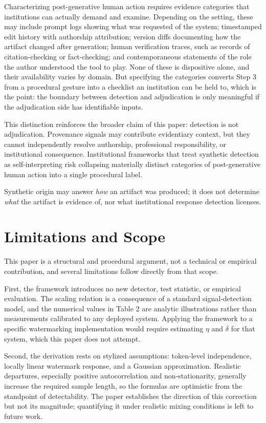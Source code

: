 \documentclass[11pt]{article}
\begin{document}
Characterizing post-generative human action requires evidence categories that
institutions can actually demand and examine. Depending on the setting, these may
include prompt logs showing what was requested of the system; timestamped edit
history with authorship attribution; version diffs documenting how the artifact
changed after generation; human verification traces, such as records of
citation-checking or fact-checking; and contemporaneous statements of the role the
author understood the tool to play. None of these is dispositive alone, and their
availability varies by domain. But specifying the categories converts Step 3 from a
procedural gesture into a checklist an institution can be held to, which is the
point: the boundary between detection and adjudication is only meaningful if the
adjudication side has identifiable inputs.

This distinction reinforces the broader claim of this paper: detection is not
adjudication. Provenance signals may contribute evidentiary context, but they cannot
independently resolve authorship, professional responsibility, or institutional
consequence. Institutional frameworks that treat synthetic detection as
self-interpreting risk collapsing materially distinct categories of post-generative
human action into a single procedural label.

Synthetic origin may answer \emph{how} an artifact was produced; it does not
determine \emph{what} the artifact is evidence of, nor what institutional response
detection licenses.

\section{Limitations and Scope}

This paper is a structural and procedural argument, not a technical or empirical
contribution, and several limitations follow directly from that scope.

First, the framework introduces no new detector, test statistic, or empirical
evaluation. The scaling relation is a consequence of a standard signal-detection
model, and the numerical values in Table 2 are analytic illustrations rather than
measurements calibrated to any deployed system. Applying the framework to a specific
watermarking implementation would require estimating $\eta$ and $\delta$ for that
system, which this paper does not attempt.

Second, the derivation rests on stylized assumptions: token-level independence,
locally linear watermark response, and a Gaussian approximation. Realistic
departures, especially positive autocorrelation and non-stationarity, generally
increase the required sample length, so the formulas are optimistic from the
standpoint of detectability. The paper establishes the direction of this correction
but not its magnitude; quantifying it under realistic mixing conditions is left to
future work.
\end{document}
